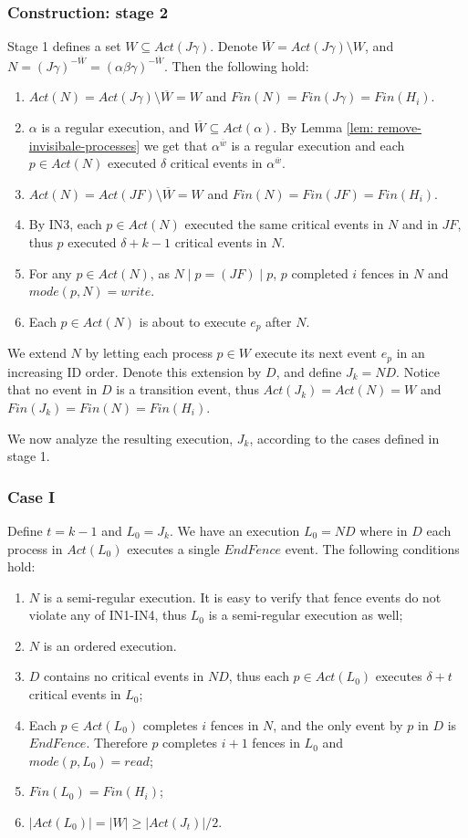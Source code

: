 \subsubsection{Construction: stage 2}
Stage 1 defines a set $W \subseteq Act(J \gamma)$. Denote $\overline{W} = Act(J \gamma) \setminus W$, and $N = (J \gamma)^{-\overline{W}} = (\alpha \beta \gamma)^{-\overline{W}}$. Then the following hold:
\begin{enumerate}
	\item $Act(N) = Act(J \gamma) \setminus \overline{W} = W$ and $Fin(N) = Fin(J \gamma) = Fin(H_i)$.
	\item $\alpha$ is a regular execution, and $\overline{W} \subseteq Act(\alpha)$. By Lemma \ref{lem: remove-invisibale-processes} we get that $\alpha^{\overline{w}}$ is a regular execution and each $p \in Act(N)$ executed $\delta$ critical events in $\alpha^{\overline{w}}$.
	\item $Act(N) = Act(J F) \setminus \overline{W} = W$ and $Fin(N) = Fin(J F) = Fin(H_i)$.
	\item By IN3, each $p \in Act(N)$ executed the same critical events in $N$ and in $J F$, thus $p$ executed $\delta+k-1$ critical events in $N$.
	\item For any $p\in Act(N)$, as $N \mid p = (J F) \mid p$, $p$ completed $i$ fences in $N$ and $mode(p,N) = write$.
	\item Each $p \in Act(N)$ is about to execute $e_p$ after $N$.
\end{enumerate}

We extend $N$ by letting each process $p \in W$ execute its next event $e_p$ in an increasing ID order. Denote this extension by $D$, and define $J_k = N D$. Notice that no event in $D$ is a transition event, thus $Act(J_k) = Act(N) = W$ and $Fin(J_k) = Fin(N) = Fin(H_i)$.

We now analyze the resulting execution, $J_k$, according to the cases defined in stage 1.
\subsubsection*{\hspace{5mm} Case I}
Define $t = k-1$ and $L_0= J_k$. We have an execution $L_0 = N D$ where in $D$ each process in $Act(L_0)$ executes a single $EndFence$ event. The following conditions hold:
\begin{enumerate}
	\item $N$ is a semi-regular execution. It is easy to verify that fence events do not violate any of IN1-IN4, thus $L_0$ is a semi-regular execution as well;
	\item $N$ is an ordered execution.
	\item $D$ contains no critical events in $N D$, thus each $p \in Act(L_0)$ executes $\delta+t$ critical events in $L_0$;
	\item Each $p \in Act(L_0)$ completes $i$ fences in $N$, and the only event by $p$ in $D$ is $EndFence$. Therefore $p$ completes $i+1$ fences in $L_0$ and $mode(p,L_0) = read$;
	\item $Fin(L_0) = Fin(H_i)$;
	\item $|Act(L_0)| = |W| \geq |Act(J_t)|/2$.
\end{enumerate}

